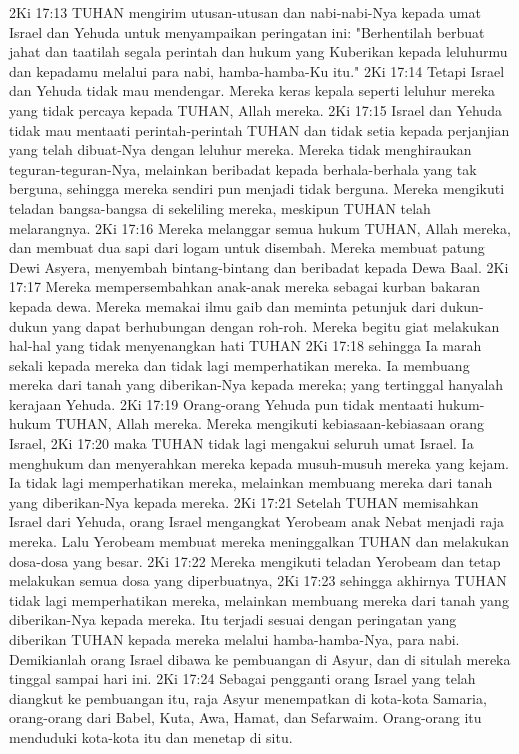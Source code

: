2Ki 17:13  TUHAN mengirim utusan-utusan dan nabi-nabi-Nya kepada umat Israel dan Yehuda untuk menyampaikan peringatan ini: "Berhentilah berbuat jahat dan taatilah segala perintah dan hukum yang Kuberikan kepada leluhurmu dan kepadamu melalui para nabi, hamba-hamba-Ku itu."
2Ki 17:14  Tetapi Israel dan Yehuda tidak mau mendengar. Mereka keras kepala seperti leluhur mereka yang tidak percaya kepada TUHAN, Allah mereka.
2Ki 17:15  Israel dan Yehuda tidak mau mentaati perintah-perintah TUHAN dan tidak setia kepada perjanjian yang telah dibuat-Nya dengan leluhur mereka. Mereka tidak menghiraukan teguran-teguran-Nya, melainkan beribadat kepada berhala-berhala yang tak berguna, sehingga mereka sendiri pun menjadi tidak berguna. Mereka mengikuti teladan bangsa-bangsa di sekeliling mereka, meskipun TUHAN telah melarangnya.
2Ki 17:16  Mereka melanggar semua hukum TUHAN, Allah mereka, dan membuat dua sapi dari logam untuk disembah. Mereka membuat patung Dewi Asyera, menyembah bintang-bintang dan beribadat kepada Dewa Baal.
2Ki 17:17  Mereka mempersembahkan anak-anak mereka sebagai kurban bakaran kepada dewa. Mereka memakai ilmu gaib dan meminta petunjuk dari dukun-dukun yang dapat berhubungan dengan roh-roh. Mereka begitu giat melakukan hal-hal yang tidak menyenangkan hati TUHAN
2Ki 17:18  sehingga Ia marah sekali kepada mereka dan tidak lagi memperhatikan mereka. Ia membuang mereka dari tanah yang diberikan-Nya kepada mereka; yang tertinggal hanyalah kerajaan Yehuda.
2Ki 17:19  Orang-orang Yehuda pun tidak mentaati hukum-hukum TUHAN, Allah mereka. Mereka mengikuti kebiasaan-kebiasaan orang Israel,
2Ki 17:20  maka TUHAN tidak lagi mengakui seluruh umat Israel. Ia menghukum dan menyerahkan mereka kepada musuh-musuh mereka yang kejam. Ia tidak lagi memperhatikan mereka, melainkan membuang mereka dari tanah yang diberikan-Nya kepada mereka.
2Ki 17:21  Setelah TUHAN memisahkan Israel dari Yehuda, orang Israel mengangkat Yerobeam anak Nebat menjadi raja mereka. Lalu Yerobeam membuat mereka meninggalkan TUHAN dan melakukan dosa-dosa yang besar.
2Ki 17:22  Mereka mengikuti teladan Yerobeam dan tetap melakukan semua dosa yang diperbuatnya,
2Ki 17:23  sehingga akhirnya TUHAN tidak lagi memperhatikan mereka, melainkan membuang mereka dari tanah yang diberikan-Nya kepada mereka. Itu terjadi sesuai dengan peringatan yang diberikan TUHAN kepada mereka melalui hamba-hamba-Nya, para nabi. Demikianlah orang Israel dibawa ke pembuangan di Asyur, dan di situlah mereka tinggal sampai hari ini.
2Ki 17:24  Sebagai pengganti orang Israel yang telah diangkut ke pembuangan itu, raja Asyur menempatkan di kota-kota Samaria, orang-orang dari Babel, Kuta, Awa, Hamat, dan Sefarwaim. Orang-orang itu menduduki kota-kota itu dan menetap di situ.
